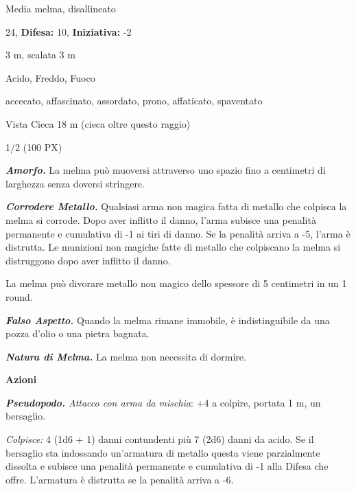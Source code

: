 \begin{multicols}{2}
{
\noindent
\begin{description}[noitemsep, topsep=0pt, parsep=0pt, partopsep=0pt, leftmargin=0cm, labelwidth=2.2cm]
	\item[\textbf{Taglia/Tipo:}] Media melma, disallineato
	\item[\textbf{Caratt.:}] 
	\item[\textbf{Punti Ferita:}] 24,  \textbf{Difesa:} 10,  \textbf{Iniziativa:} -2
	\item[\textbf{Movimento:}] 3 m, scalata 3 m
	\item[\textbf{Tiri Salvez.:}] 
	\item[\textbf{Res. Danni:}] Acido, Freddo, Fuoco
	\item[\textbf{Immunità:}] accecato, affascinato, assordato, prono, affaticato, spaventato
	\item[\textbf{Sensi:}] Vista Cieca 18 m (cieca oltre questo raggio)
	\item[\textbf{Sfida:}] 1/2 (100 PX)\smallskip
\end{description}

\emph{\textbf{Amorfo.}} La melma può muoversi attraverso uno spazio fino a centimetri di larghezza senza doversi stringere.

\emph{\textbf{Corrodere Metallo.}} Qualsiasi arma non magica fatta di metallo che colpisca la melma si corrode. Dopo aver inflitto il danno, l'arma subisce una penalità permanente e cumulativa di -1 ai tiri di danno. Se la penalità arriva a -5, l'arma è distrutta. Le munizioni non magiche fatte di metallo che colpiscano la melma si distruggono dopo aver inflitto il danno.

La melma può divorare metallo non magico dello spessore di 5 centimetri in un 1 round.

\emph{\textbf{Falso Aspetto.}} Quando la melma rimane immobile, è indistinguibile da una pozza d'olio o una pietra bagnata.

\emph{\textbf{Natura di Melma.}} La melma non necessita di dormire.

\textbf{Azioni}

\emph{\textbf{Pseudopodo.} Attacco con arma da mischia}: +4 a colpire, portata 1 m, un bersaglio.

\emph{Colpisce:} 4 (1d6 + 1) danni contundenti più 7 (2d6) danni da acido. Se il bersaglio sta indossando un'armatura di metallo questa viene parzialmente dissolta e subisce una penalità permanente e cumulativa di -1 alla Difesa che offre. L'armatura è distrutta se la penalità arriva a -6.

}
\end{multicols}
